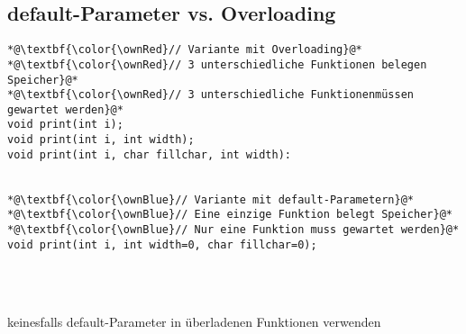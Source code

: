 \subsection{default-Parameter vs. Overloading\hfill}
\label{sec:unterabschnitt}
\noindent
\begin{minipage}{\linewidth}
\begin{lstlisting}
*@\textbf{\color{\ownRed}// Variante mit Overloading}@*
*@\textbf{\color{\ownRed}// 3 unterschiedliche Funktionen belegen Speicher}@*
*@\textbf{\color{\ownRed}// 3 unterschiedliche Funktionenmüssen gewartet werden}@*
void print(int i);
void print(int i, int width);
void print(int i, char fillchar, int width):
	
	
*@\textbf{\color{\ownBlue}// Variante mit default-Parametern}@*
*@\textbf{\color{\ownBlue}// Eine einzige Funktion belegt Speicher}@*
*@\textbf{\color{\ownBlue}// Nur eine Funktion muss gewartet werden}@*
void print(int i, int width=0, char fillchar=0);	
\end{lstlisting}
\end{minipage}
\\
\\
\begin{achtung}
keinesfalls default-Parameter in überladenen Funktionen verwenden
\end{achtung}


 